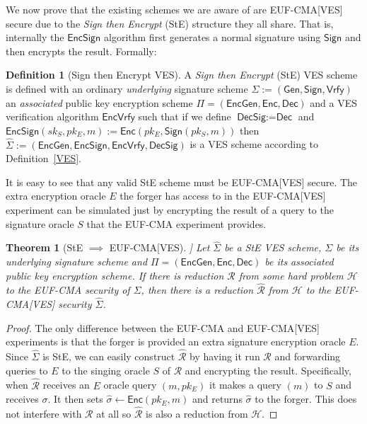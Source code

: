 \documentclass[fullpage]{article}
\newtheorem{theorem}{Theorem}[section]
\theoremstyle{definition}
\newtheorem{definition}{Definition}[section]
\newcommand{\EUFCMA}{\textsf{EUF-CMA}\xspace}
\newcommand{\EUFCMAVES}{\textsf{EUF-CMA}[\textsf{VES}]\xspace}
\newcommand{\Dec}{\textsf{Dec}}
\newcommand{\Enc}{\textsf{Enc}}
\newcommand{\EncGen}{\textsf{EncGen}}
\newcommand{\EncSign}{\textsf{EncSign}}
\newcommand{\EncVer}{\textsf{EncVrfy}}
\newcommand{\DecSig}{\textsf{DecSig}}
\newcommand{\KeyGen}{\textsf{Gen}}
\newcommand{\Sign}{\textsf{Sign}}
\newcommand{\Verify}{\textsf{Vrfy}}
\newcommand{\SIGNALG}{\KeyGen, \Sign, \Verify}
\newcommand{\ENCALG}{\EncGen, \Enc, \Dec}
\newcommand{\skSign}{sk_S}
\newcommand{\pkSign}{pk_S}
\newcommand{\pkEnc}{pk_E}
\newcommand{\hatsigma}{\hat{\sigma}}
\newcommand{\hatSigma}{\hat{\Sigma}}
\newcommand{\R}{\mathcal{R}}
\newcommand{\hatR}{\hat{\mathcal{R}}}
\newcommand{\hardproblem}{\mathcal{H}}
\begin{document}
We now prove that the existing schemes we are aware of\cite{Boneh:2003:AVE:1766171.1766207, Ruckert:2009:SVE:1615384.1615387, waters-ves, SHAO20081961, VES-structure-preserving} are \EUFCMAVES secure due to the \emph{Sign then Encrypt} (StE) structure they all share. That is, internally the $\EncSign$ algorithm first generates a normal signature using $\Sign$ and then encrypts the result. Formally:

\begin{definition}[Sign then Encrypt VES]
A \emph{Sign then Encrypt} (StE) VES scheme is defined with an ordinary \emph{underlying} signature scheme $\Sigma := (\SIGNALG)$ an \emph{associated} public key encryption scheme $\Pi = (\ENCALG)$ and a VES verification algorithm $\EncVer$ such that if we define $\DecSig := \Dec$ and $\EncSign(\skSign, \pkEnc, m) := \Enc(\pkEnc, \Sign(\pkSign, m))$ then $\hatSigma := (\EncGen, \EncSign, \EncVer, \DecSig)$ is a VES scheme according to Definition~\ref{VES}.
\end{definition}

It is easy to see that any valid StE scheme must be \EUFCMAVES secure. The extra encryption oracle $E$ the forger has access to in the \EUFCMAVES experiment can be simulated just by encrypting the result of a query to the signature oracle $S$ that the \EUFCMA experiment provides.

\begin{theorem}[StE $\implies$ \EUFCMAVES]
Let $\hatSigma$ be a StE VES scheme,  $\Sigma$ be its underlying signature scheme and $\Pi = (\ENCALG)$ be its associated public key encryption scheme.
If there is reduction $\R$ from some hard problem $\hardproblem$ to the \EUFCMA security of $\Sigma$, then there is a reduction $\hatR$ from $\hardproblem$ to the \EUFCMAVES security $\hatSigma$.
\end{theorem}

\begin{proof}
The only difference between the \EUFCMA and \EUFCMAVES experiments is that the forger is provided an extra signature encryption oracle $E$. Since $\hatSigma$ is StE, we can easily construct $\hatR$ by having it run $\R$ and forwarding queries to $E$ to the singing oracle $S$ of $\R$ and encrypting the result. Specifically, when $\hatR$ receives an $E$ oracle query $(m, \pkEnc)$ it makes a query $(m)$ to $S$ and receives $\sigma$. It then sets $\hatsigma \gets \Enc(\pkEnc, m)$ and returns $\hatsigma$ to the forger. This does not interfere with $\R$ at all so $\hatR$ is also a reduction from $\hardproblem$.
\end{proof}
\end{document}
